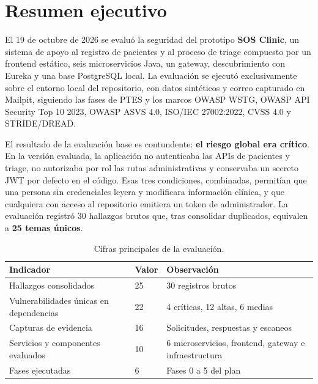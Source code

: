 \section{Resumen ejecutivo}

El 19 de octubre de 2026 se evaluó la seguridad del prototipo \textbf{SOS Clinic},
un sistema de apoyo al registro de pacientes y al proceso de triage compuesto por
un frontend estático, seis microservicios Java, un gateway, descubrimiento con
Eureka y una base PostgreSQL local. La evaluación se ejecutó exclusivamente sobre el entorno local del
repositorio, con datos sintéticos y correo capturado en Mailpit, siguiendo las
fases de PTES y los marcos OWASP WSTG, OWASP API Security Top 10 2023, OWASP
ASVS 4.0, ISO/IEC 27002:2022, CVSS 4.0 y STRIDE/DREAD.

El resultado de la evaluación base es contundente: \textbf{el riesgo global era
crítico}. En la versión evaluada, la aplicación no autenticaba las APIs de
pacientes y triage, no autorizaba por rol las rutas administrativas y conservaba
un secreto JWT por defecto en el código. Esas tres condiciones, combinadas,
permitían que una persona sin credenciales leyera y modificara información clínica,
y que cualquiera con acceso al repositorio emitiera un token de administrador. La
evaluación registró 30 hallazgos brutos que, tras consolidar duplicados, equivalen
a \textbf{25 temas únicos}.

\begin{table}[htbp]
\centering
\caption{Cifras principales de la evaluación.}
\label{tab:cifras}
\begin{tabular}{@{}L{8.2cm}C{3.2cm}C{3.2cm}@{}}
\toprule
\textbf{Indicador} & \textbf{Valor} & \textbf{Observación}\\
\midrule
Hallazgos consolidados & 25 & 30 registros brutos\\
Vulnerabilidades únicas en dependencias & 22 & 4 críticas, 12 altas, 6 medias\\
Capturas de evidencia & 16 & Solicitudes, respuestas y escaneos\\
Servicios y componentes evaluados & 10 & 6 microservicios, frontend, gateway e infraestructura\\
Fases ejecutadas & 6 & Fases 0 a 5 del plan\\
\bottomrule
\end{tabular}
\end{table}

